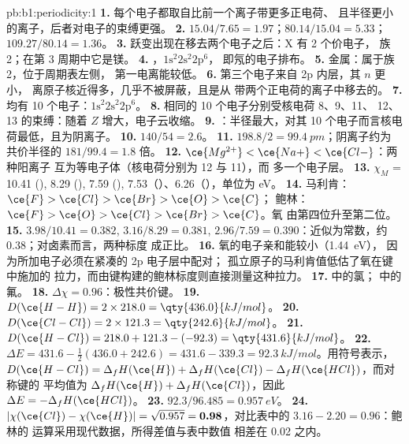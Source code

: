\begin{solution}{pb:b1:periodicity:1}
\textbf{1.} 每个电子都取自比前一个离子带更多正电荷、
且半径更小的离子，后者对电子的束缚更强。
\textbf{2.} $15.04/7.65 = 1.97$；$80.14/15.04 = 5.33$；$109.27/80.14 = 1.36$。
\textbf{3.} 跃变出现在移去两个电子之后：X 有 2 个价电子，
族 2；在第 3 周期中它是镁。
\textbf{4.} ，$1\text{s}^2 2\text{s}^2 2\text{p}^6$，
即氖的电子排布。
\textbf{5.} 金属：属于族 2，位于周期表左侧，
第一电离能较低。
\textbf{6.} 第三个电子来自 2p 内层，其 $n$ 更小，
离原子核近得多，几乎不被屏蔽，且是从
带两个正电荷的离子中移去的。
\textbf{7.} 均有 10 个电子：$1\text{s}^2 2\text{s}^2 2\text{p}^6$。
\textbf{8.} 相同的 10 个电子分别受核电荷 8、9、11、
12、13 的束缚：随着 $Z$ 增大，电子云收缩。
\textbf{9.} ：半径最大，对其
10 个电子而言核电荷最低，且为阴离子。
\textbf{10.} $140/54 = 2.6$。
\textbf{11.} $198.8/2 = \qty{99.4}{pm}$；阴离子约为
共价半径的 $181/99.4 = 1.8$ 倍。
\textbf{12.} $\ce{Mg^{2+}} < \ce{Na+} < \ce{Cl-}$：两种阳离子
互为等电子体（核电荷分别为 12 与 11），而  多一个电子层。
\textbf{13.} $\chi_M$ = 10.41 (), 8.29 (), 7.59 (),
7.53（）、6.26（），单位为 eV。
\textbf{14.} 马利肯：$\ce{F} > \ce{Cl} > \ce{Br} > \ce{O} > \ce{C}$；
鲍林：$\ce{F} > \ce{O} > \ce{Cl} > \ce{Br} > \ce{C}$。氧
由第四位升至第二位。
\textbf{15.} $3.98/10.41 = 0.382$, $3.16/8.29 = 0.381$, $2.96/7.59 =
0.390$：近似为常数，约 0.38；对卤素而言，两种标度
成正比。
\textbf{16.} 氧的电子亲和能较小（\qty{1.44}{eV}），
因为所加电子必须在紧凑的 2p 电子层中配对；
孤立原子的马利肯值低估了氧在键中施加的
拉力，而由键构建的鲍林标度则直接测量这种拉力。
\textbf{17.}  中的氯； 中的氟。
\textbf{18.} $\Delta\chi = 0.96$：极性共价键。
\textbf{19.} $D(\ce{H-H}) = 2 \times 218.0 = \qty{436.0}{kJ/mol}$。
\textbf{20.} $D(\ce{Cl-Cl}) = 2 \times 121.3 = \qty{242.6}{kJ/mol}$。
\textbf{21.} $D(\ce{H-Cl}) = 218.0 + 121.3 - (-92.3) = \qty{431.6}{kJ/mol}$。
\textbf{22.} $\Delta E = 431.6 - \tfrac12(436.0 + 242.6) = 431.6 - 339.3 =
\qty{92.3}{kJ/mol}$。用符号表示，$D(\ce{H-Cl}) = \Delta_fH(\ce{H}) +
\Delta_fH(\ce{Cl}) - \Delta_fH(\ce{HCl})$，而对称键的
平均值为 $\Delta_fH(\ce{H}) + \Delta_fH(\ce{Cl})$，因此 $\Delta E =
-\Delta_fH(\ce{HCl})$。
\textbf{23.} $92.3/96.485 = \qty{0.957}{eV}$。
\textbf{24.} $|\chi(\ce{Cl}) - \chi(\ce{H})| = \sqrt{0.957} =
\textbf{0.98}$，对比表中的 $3.16 - 2.20 = 0.96$：鲍林的
运算采用现代数据，所得差值与表中数值
相差在 0.02 之内。
\end{solution}
